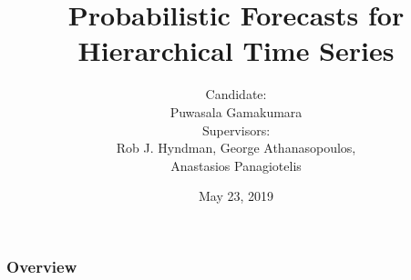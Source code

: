 \documentclass[11pt,xcolor=dvipsnames,table]{beamer} %
\title[\textcolor{white}{Probabilistic Hierarchical Forecasting}]{Probabilistic Forecasts for Hierarchical Time Series}
\author[Puwasala Gamakumara]{Candidate:\\Puwasala Gamakumara\\ \medskip \medskip Supervisors:\\  Rob J. Hyndman, George Athanasopoulos,\\Anastasios Panagiotelis }
\institute[]{Department of Econometrics and Business Statistics\\ \medskip Monash University}
\date{May 23, 2019}
\begin{document}
\begin{frame}
\titlepage
\end{frame}

\begin{frame}
\frametitle{Overview} %
\tableofcontents %
\end{frame}


%




%
\end{document}
